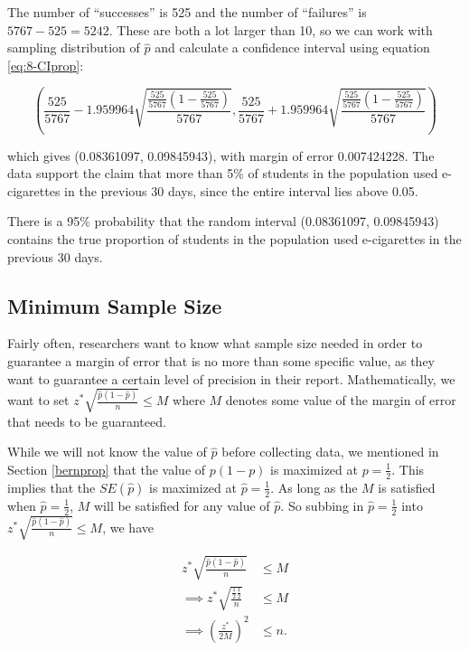 \documentclass[
]{book}
\begin{document}
The number of ``successes'' is 525 and the number of ``failures'' is \(5767-525 = 5242\). These are both a lot larger than 10, so we can work with sampling distribution of \(\hat{p}\) and calculate a confidence interval using equation \eqref{eq:8-CIprop}:

\[
\left( \frac{525}{5767} - 1.959964 \sqrt{\frac{\frac{525}{5767}(1-\frac{525}{5767})}{5767}} , \frac{525}{5767} + 1.959964 \sqrt{\frac{\frac{525}{5767}(1-\frac{525}{5767})}{5767}} \right)
\]

which gives (0.08361097, 0.09845943), with margin of error 0.007424228. The data support the claim that more than 5\% of students in the population used e-cigarettes in the previous 30 days, since the entire interval lies above 0.05.

There is a 95\% probability that the random interval (0.08361097, 0.09845943) contains the true proportion of students in the population used e-cigarettes in the previous 30 days.

\hypertarget{minimum-sample-size}{%
\subsection{Minimum Sample Size}\label{minimum-sample-size}}

Fairly often, researchers want to know what sample size needed in order to guarantee a margin of error that is no more than some specific value, as they want to guarantee a certain level of precision in their report. Mathematically, we want to set \(z^{*} \sqrt{\frac{\hat{p}(1-\hat{p})}{n}} \leq M\) where \(M\) denotes some value of the margin of error that needs to be guaranteed.

While we will not know the value of \(\hat{p}\) before collecting data, we mentioned in Section \ref{bernprop} that the value of \(p(1-p)\) is maximized at \(p=\frac{1}{2}\). This implies that the \(SE(\hat{p})\) is maximized at \(\hat{p} = \frac{1}{2}\). As long as the \(M\) is satisfied when \(\hat{p} = \frac{1}{2}\), \(M\) will be satisfied for any value of \(\hat{p}\). So subbing in \(\hat{p} = \frac{1}{2}\) into \(z^{*} \sqrt{\frac{\hat{p}(1-\hat{p})}{n}} \leq M\), we have

\begin{equation} 
\begin{split}
z^{*} \sqrt{\frac{\hat{p}(1-\hat{p})}{n}} & \leq M \\
\implies z^* \sqrt{\frac{\frac{1}{2}\frac{1}{2}}{n}}  & \leq M \\
\implies \left(\frac{z^*}{2M}\right)^2 & \leq n.
\end{split}
\label{eq:8-minsamp}
\end{equation}
\end{document}
